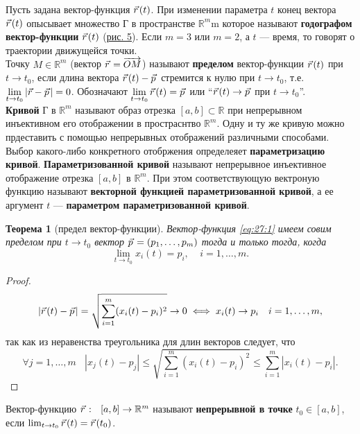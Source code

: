 \documentclass[12pt]{report}
\numberwithin{equation}{section}
\newtheorem{theorem}{Теорема}[section]
\newcommand{\pvec}[1]{\vec{#1}\mkern2mu\vphantom{#1}}
\begin{document}
Пусть задана вектор-функция $\pvec{r}(t)$. При изменении параметра $t$ конец вектора $\pvec{r}(t)$ опысывает множество Г в пространстве $\mathbb{R}^m$m которое называют \textbf{годографом вектор-функции} $\pvec{r}(t)$ (\hyperref[pic:27:1]{рис. 5}). Если $m = 3$ или $m = 2$, а $t$ --- время, то говорят о траектории движущейся точки.\\

Точку $M \in \mathbb{R}^m$ (вектор $\pvec{r} = \overrightarrow{OM}$) называют \textbf{пределом} вектор-функции $\pvec{r}(t)$ при $t \to t_0$, если длина вектора $\pvec{r}(t) - \pvec{p}$ стремится к нулю при $t \to t_0$, т.е. $\lim\limits_{t \to t_0} |\vec{r} - \pvec{p}| = 0$. Обозначают $\lim\limits_{t \to t_0}\pvec{r}(t) = \pvec{p}$ или ``$\pvec{r}(t) \to \pvec{p}$ при $t \to t_0$''.\\


\textbf{Кривой} Г в $\mathbb{R}^m$ называют образ отрезка $[a,b] \subset \mathbb{R}$ при непрерывном инъективном его отображении в простраснтво $\mathbb{R}^m$. Одну и ту же кривую можно прдеставить с помощью непрерывных отображений различными способами. Выбор какого-либо конкретного отобржения определеяет \textbf{параметризацию кривой}. \textbf{Параметризованной кривой} называют непрерывное инъективное отображение отрезка $[a,b]$ в $\mathbb{R}^m$. При этом соответствующую вектроную функцию называют \textbf{векторной функцией параметризованной кривой}, а ее аргумент $t$ --- \textbf{параметром параметризованной кривой}.

\begin{theorem}[предел вектор-функции] \label{th:27:1}
Вектор-функция \eqref{eq:27:1} имеем совим пределом при $t \to t_0$ вектор $\pvec{p} = (p_1, \ldots, p_m)$ тогда и только тогда, когда
\[ \lim_{t \to t_0} x_i(t) = p_i,~~~~~ i = 1,\ldots, m.\]
\end{theorem}

\begin{proof}
\[ |\pvec{r}(t) - \pvec{p}| = \sqrt{\sum_{i=1}^{m} (x_i(t) - p_i)^2} \to 0 \iff x_i(t) \to p_i~~~ i = 1, \ldots, m,\]
так как из неравенства треугольника для длин векторов следует, что
\[ \forall j = 1, \ldots, m~~~~ |x_j(t) - p_j| \leqslant \sqrt{\sum_{i=1}^m (x_i(t) - p_i)^2} \leqslant \sum_{i=1}^m |x_i(t) - p_i|.\]
\end{proof}

Вектор-функцию $\pvec{r}: ~~ [a,b] \to \mathbb{R}^m$ называют \textbf{непрерывной в точке} $t_0 \in [a,b]$, если $\lim_{t \to t_0}\pvec{r}(t) = \pvec{r}(t_0)$.
\end{document}
